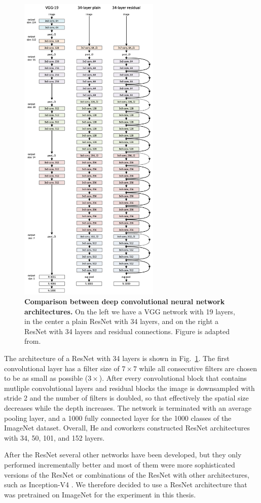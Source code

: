 \begin{figure}[h!]
	\centering
	\captionsetup{width=1\linewidth}
	\includegraphics[width=0.6\textwidth]{Figures/resnet_architecture.png}
	\caption{\textbf{Comparison between deep convolutional neural network architectures.} On the left we have a VGG network with 19 layers, in the center a plain ResNet with 34 layers, and on the right a ResNet with 34 layers and residual connections. Figure is adapted from\parencite{he2015}.}
	\label{fig:resnet}
\end{figure}

The architecture of a ResNet with 34 layers is shown in Fig.~\ref{fig:resnet}. The first convolutional layer has a filter size of $7\times7$ while all consecutive filters are chosen to be as small as possible ($3\times$). After every convolutional block that contains mutliple convolutional layers and residual blocks the image is downsampled with stride 2 and the number of filters is doubled, so that effectively the spatial size decreases while the depth increases. The network is terminated with an average pooling layer, and a 1000 fully connected layer for the 1000 classes of the ImageNet dataset. Overall, He and coworkers constructed ResNet architectures with 34, 50, 101, and 152 layers.

After the ResNet several other networks have been developed, but they only performed incrementally better and most of them were more sophisticated versions of the ResNet or combinations of the ResNet with other architectures, such as Inception-V4 \parencite{szegedy2016}. We therefore decided to use a ResNet architecture that was pretrained on ImageNet for the experiment in this thesis.
